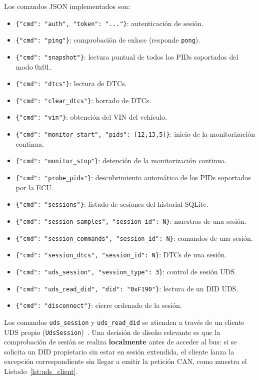 Los comandos JSON implementados son:

\begin{itemize}
    \item \verb|{"cmd": "auth", "token": "..."}|: autenticación de sesión.
    \item \verb|{"cmd": "ping"}|: comprobación de enlace (responde \texttt{pong}).
    \item \verb|{"cmd": "snapshot"}|: lectura puntual de todos los PIDs soportados del modo 0x01.
    \item \verb|{"cmd": "dtcs"}|: lectura de DTCs.
    \item \verb|{"cmd": "clear_dtcs"}|: borrado de DTCs.
    \item \verb|{"cmd": "vin"}|: obtención del VIN del vehículo.
    \item \verb|{"cmd": "monitor_start", "pids": [12,13,5]}|: inicio de la monitorización continua.
    \item \verb|{"cmd": "monitor_stop"}|: detención de la monitorización continua.
    \item \verb|{"cmd": "probe_pids"}|: descubrimiento automático de los PIDs soportados por la ECU.
    \item \verb|{"cmd": "sessions"}|: listado de sesiones del historial SQLite.
    \item \verb|{"cmd": "session_samples", "session_id": N}|: muestras de una sesión.
    \item \verb|{"cmd": "session_commands", "session_id": N}|: comandos de una sesión.
    \item \verb|{"cmd": "session_dtcs", "session_id": N}|: DTCs de una sesión.
    \item \verb|{"cmd": "uds_session", "session_type": 3}|: control de sesión UDS.
    \item \verb|{"cmd": "uds_read_did", "did": "0xF190"}|: lectura de un DID UDS.
    \item \verb|{"cmd": "disconnect"}|: cierre ordenado de la sesión.
\end{itemize}

Los comandos \texttt{uds\_session} y \texttt{uds\_read\_did} se atienden a través de un cliente UDS propio (\texttt{UdsSession})~\cite{ISO14229-1:2020}. Una decisión de diseño relevante es que la comprobación de sesión se realiza \textbf{localmente} antes de acceder al bus: si se solicita un DID propietario sin estar en sesión extendida, el cliente lanza la excepción correspondiente sin llegar a emitir la petición CAN, como muestra el Listado~\ref{lst:uds_client}.

